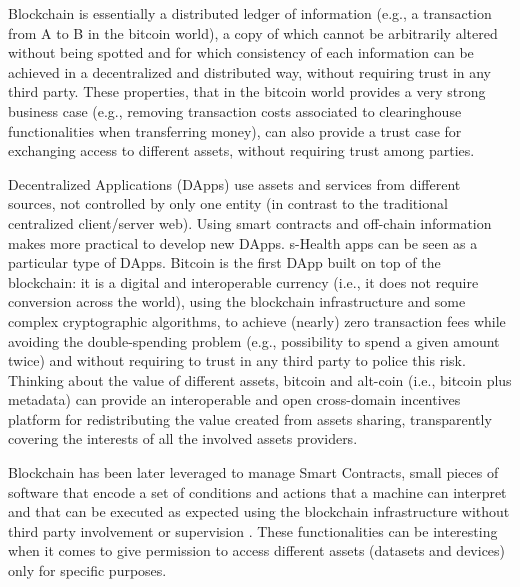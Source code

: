 \documentclass[conference]{IEEEtran}
\begin{document}
Blockchain is essentially a distributed ledger of information (e.g., a transaction from A to B in the bitcoin world), a copy of which cannot be arbitrarily altered without being spotted and for which consistency of each information can be achieved in a decentralized and distributed way, without requiring trust in any third party. These properties, that in the bitcoin world provides a very strong business case (e.g., removing transaction costs associated to clearinghouse functionalities when transferring money), can also provide a trust case for exchanging access to different assets, without requiring trust among parties.

Decentralized Applications (DApps) use assets and services from different sources, not controlled by only one entity (in contrast to the traditional centralized client/server web). Using smart contracts and off-chain information makes more practical to develop new DApps. s-Health apps can be seen as a particular type of DApps. Bitcoin is the first DApp built on top of the blockchain: it is a digital and interoperable currency (i.e., it does not require conversion across the world), using the blockchain infrastructure and some complex cryptographic algorithms, to achieve (nearly) zero transaction fees while avoiding the double-spending problem (e.g., possibility to spend a given amount twice) and without requiring to trust in any third party to police this risk. Thinking about the value of different assets, bitcoin and alt-coin (i.e., bitcoin plus metadata) can provide an interoperable and open cross-domain incentives platform for redistributing the value created from assets sharing, transparently covering the interests of all the involved assets providers.

Blockchain has been later leveraged to manage Smart Contracts, small pieces of software that encode a set of conditions and actions that a machine can interpret and that can be executed as expected using the blockchain infrastructure without third party involvement or supervision \cite{Buterin2014}. These functionalities can be interesting when it comes to give permission to access different assets (datasets and devices) only for specific purposes.
\end{document}
